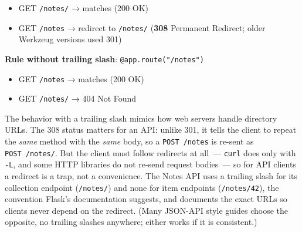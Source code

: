 \begin{itemize}
\tightlist
\item
  GET \texttt{/notes/} → matches (200 OK)
\item
  GET \texttt{/notes} → redirect to \texttt{/notes/} (\textbf{308} Permanent Redirect; older Werkzeug versions used 301)
\end{itemize}

\noindent{}\textbf{Rule without trailing slash}: \texttt{@app.route("/}\allowbreak{}\texttt{notes")}

\begin{itemize}
\tightlist
\item
  GET \texttt{/notes} → matches (200 OK)
\item
  GET \texttt{/notes/} → 404 Not Found
\end{itemize}

\noindent{}The behavior with a trailing slash mimics how web servers handle directory URLs. The 308 status matters for an API: unlike 301, it tells the client to repeat the \emph{same} method with the \emph{same} body, so a \texttt{POST\ /notes} is re-sent as \texttt{POST\ /notes/}. But the client must follow redirects at all~--- \texttt{curl} does only with \texttt{-L}, and some HTTP libraries do not re-send request bodies~--- so for API clients a redirect is a trap, not a convenience. The Notes API uses a trailing slash for its collection endpoint (\texttt{/notes/}) and none for item endpoints (\texttt{/notes/42}), the convention Flask's documentation suggests, and documents the exact URLs so clients never depend on the redirect. (Many JSON-API style guides choose the opposite, no trailing slashes anywhere; either works if it is consistent.)

